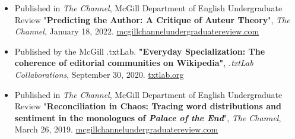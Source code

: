 \begin{itemize}
\item  Published in \textit{The Channel}, McGill Department of English Undergraduate Review "\textbf{Predicting the Author: A Critique of Auteur Theory}", \textit{The Channel}, January 18, 2022. \href{http://mcgillchannelundergraduatereview.com/2022/01/predicting-the-author-a-critique-of-auteur-theory//}{mcgillchannelundergraduatereview.com}
\end{itemize}
\begin{itemize}
    \item Published by the McGill .txtLab. \textbf{"Everyday Specialization: The coherence of editorial communities on Wikipedia"}, \textit{.txtLab Collaborations}, September 30, 2020.  \href{https://txtlab.org/2020/09/do-wikipedia-editors-specialize/}{txtlab.org}
\end{itemize}
\begin{itemize}
\item  Published in \textit{The Channel}, McGill Department of English Undergraduate Review "\textbf{Reconciliation in Chaos: Tracing word distributions and sentiment in the monologues of \textit{Palace of the End}}", \textit{The Channel}, March 26, 2019. \href{http://mcgillchannelundergraduatereview.com/2019/03/reconciliation-in-chaos-tracing-word-distributions-and-sentiment-in-the-monologues-of-palace-of-the-end/}{mcgillchannelundergraduatereview.com}
\end{itemize}
